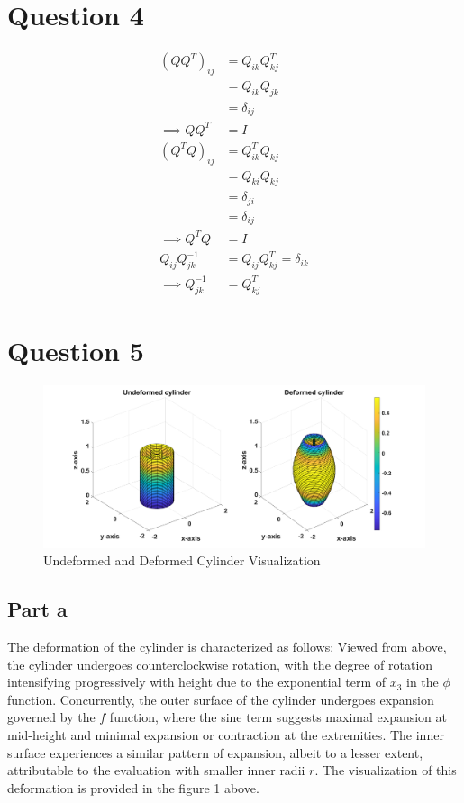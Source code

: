 \documentclass[a4paper,12pt]{article} %
\begin{document}
\newpage
\section{\textbf{Question 4}}
\begin{align*}
    (QQ^T)_{ij} &= Q_{ik} Q^T_{kj} \\
&= Q_{ik} Q_{jk} \\
&= \delta_{ij} \\
\implies QQ^T &= I\\
(Q^TQ)_{ij} &= Q^T_{ik} Q_{kj} \\
&= Q_{ki} Q_{kj} \\
&= \delta_{ji} \\
&= \delta_{ij} \\
\implies Q^TQ &= I \\
Q_{ij} Q^{-1}_{jk} &= Q_{ij} Q^T_{kj} = \delta_{ik} \\
    \implies Q^{-1}_{jk} &= Q^T_{kj}
\end{align*}

\newpage
\section{\textbf{Question 5}}


\begin{figure}[htbp]
     \includegraphics[scale=0.35]{MECH503HW1Q5_1.png}
    
    \caption{Undeformed and Deformed Cylinder Visualization}

\end{figure}

\subsection{Part a}
The deformation of the cylinder is characterized as follows: Viewed from above, the cylinder undergoes counterclockwise rotation, with the degree of rotation intensifying progressively with height due to the exponential term of $x_3$ in the $\phi$ function. Concurrently, the outer surface of the cylinder undergoes expansion governed by the $f$ function, where the sine term suggests maximal expansion at mid-height and minimal expansion or contraction at the extremities. The inner surface experiences a similar pattern of expansion, albeit to a lesser extent, attributable to the evaluation with smaller inner radii $r$.
The visualization of this deformation is provided in the figure 1 above.
\end{document}
